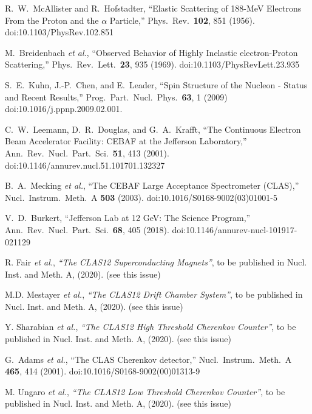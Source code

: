 \documentclass[final,3p,twocolumn]{elsarticle}
\begin{document}
\begin{thebibliography}{99}

  R.~W.~McAllister and R.~Hofstadter,
  ``Elastic Scattering of 188-{MeV} Electrons From the Proton and the $\alpha$ Particle,''
  Phys.\ Rev.\  {\bf 102}, 851 (1956).
  doi:10.1103/PhysRev.102.851

  M.~Breidenbach {\it et al.},
  ``Observed Behavior of Highly Inelastic electron-Proton Scattering,''
  Phys.\ Rev.\ Lett.\  {\bf 23}, 935 (1969).
  doi:10.1103/PhysRevLett.23.935
  
  S.~E.~Kuhn, J.-P.~Chen, and E.~Leader,
  ``Spin Structure of the Nucleon - Status and Recent Results,''
  Prog.\ Part.\ Nucl.\ Phys.\  {\bf 63}, 1 (2009)
  doi:10.1016/j.ppnp.2009.02.001.
 
  C.~W.~Leemann, D.~R.~Douglas, and G.~A.~Krafft,
  ``The Continuous Electron Beam Accelerator Facility: CEBAF at the Jefferson Laboratory,''
  Ann.\ Rev.\ Nucl.\ Part.\ Sci.\  {\bf 51}, 413 (2001).
  doi:10.1146/annurev.nucl.51.101701.132327

  B.~A.~Mecking {\it et al.},
  ``The CEBAF Large Acceptance Spectrometer (CLAS),''
  Nucl.\ Instrum.\ Meth.\ A {\bf 503} (2003).
  doi:10.1016/S0168-9002(03)01001-5

  V.~D.~Burkert,
  ``Jefferson Lab at 12 GeV: The Science Program,''
  Ann.\ Rev.\ Nucl.\ Part.\ Sci.\  {\bf 68}, 405 (2018).
  doi:10.1146/annurev-nucl-101917-021129 
  
R. Fair {\it et al.}, {\it ``The CLAS12 Superconducting Magnets''}, to be published in Nucl. Inst.
and Meth. A, (2020). (see this issue)

M.D. Mestayer {\it et al.}, {\it ``The CLAS12 Drift Chamber System''}, to be published in Nucl. Inst.
and Meth. A, (2020). (see this issue)

Y. Sharabian {\it et al.}, {\it ``The CLAS12 High Threshold Cherenkov Counter''}, to be published in Nucl. Inst.
and Meth. A, (2020). (see this issue)

  G.~Adams {\it et al.},
  ``The CLAS Cherenkov detector,''
  Nucl.\ Instrum.\ Meth.\ A {\bf 465}, 414 (2001).
  doi:10.1016/S0168-9002(00)01313-9

M. Ungaro {\it et al.}, {\it ``The CLAS12 Low Threshold Cherenkov Counter''}, to be published in Nucl. Inst.
and Meth. A, (2020). (see this issue)


\end{thebibliography}
\end{document}
